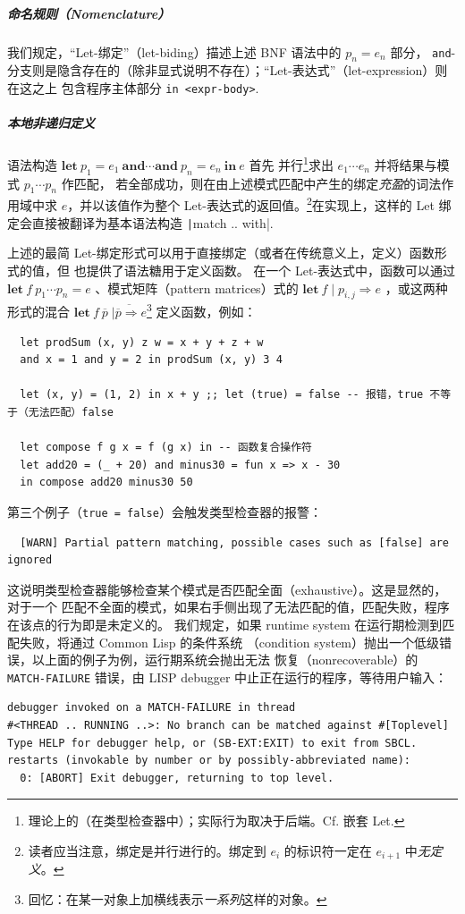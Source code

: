 \documentclass[a4paper, 11pt]{article}
\theoremstyle{remark}\newtheorem*{remark}{Remark}
\theoremstyle{definition}\newtheorem*{definition}{Definition}
\begin{document}
\subparagraph*{命名规则（Nomenclature）} 我们规定，“Let-绑定”（let-biding）描述上述 BNF 语法中的 $p_n = e_n$ 部分，
\texttt{and}-分支则是隐含存在的（除非显式说明不存在）；“Let-表达式”（let-expression）则在这之上
包含程序主体部分 \texttt{in <expr-body>}.
\subparagraph*{本地非递归定义} 语法构造 $\mathbf{let}\ p_1 = e_1\ \mathbf{and}\cdots\mathbf{and}\ p_n = e_n\ \mathbf{in}\ e$ 首先
并行\footnote{理论上的（在类型检查器中）；实际行为取决于后端。Cf. 嵌套 Let.}求出 \(e_1\cdots e_n\) 并将结果与模式 \(p_1\cdots p_n\) 作匹配，
若全部成功，则在由上述模式匹配中产生的绑定\emph{充盈}的词法作用域中求 $e$，并以该值作为整个 Let-表达式的返回值。\footnote{
  读者应当注意，绑定是并行进行的。绑定到 \(e_{i}\) 的标识符一定在 \(e_{i+1}\) 中\emph{无定义}。
}在实现上，这样的 Let 绑定会直接被翻译为基本语法构造 \texttt|match .. with|.

上述的最简 Let-绑定形式可以用于直接绑定（或者在传统意义上，定义）函数形式的值，但 \Tigris 也提供了语法糖用于定义函数。
在一个 Let-表达式中，函数可以通过 \(\mathbf{let}\ f\ p_1\cdots p_n = e\) 、模式矩阵（pattern matrices）式的 \(\mathbf{let}\ f\mid p_{i,j}\Rightarrow e\) ，或这两种
形式的混合 \(\mathbf{let}\ f\ \overline{p}\;\overline{\mid \overline{p}\Rightarrow e}\)\footnote{
  回忆：在某一对象上加横线表示\emph{一系列}这样的对象。
}
定义函数，例如：
\begin{verbatim}
  let prodSum (x, y) z w = x + y + z + w
  and x = 1 and y = 2 in prodSum (x, y) 3 4

  let (x, y) = (1, 2) in x + y ;; let (true) = false -- 报错，true 不等于（无法匹配）false

  let compose f g x = f (g x) in -- 函数复合操作符
  let add20 = (_ + 20) and minus30 = fun x => x - 30
  in compose add20 minus30 50
\end{verbatim}
第三个例子（\texttt{true = false}）会触发类型检查器的报警：
\begin{Verbatim}
  [WARN] Partial pattern matching, possible cases such as [false] are ignored
\end{Verbatim}
这说明类型检查器能够检查某个模式是否匹配全面（exhaustive）。这是显然的，对于一个
匹配不全面的模式，如果右手侧出现了无法匹配的值，匹配失败，程序在该点的行为即是未定义的。
我们规定，如果 runtime system 在运行期检测到匹配失败，将通过 Common Lisp 的条件系统
（condition system）抛出一个低级错误，以上面的例子为例，运行期系统会抛出无法
恢复（nonrecoverable）的 \texttt{MATCH-FAILURE}
错误，由 LISP debugger 中止正在运行的程序，等待用户输入：
\begin{Verbatim}
debugger invoked on a MATCH-FAILURE in thread
#<THREAD .. RUNNING ..>: No branch can be matched against #[Toplevel]
Type HELP for debugger help, or (SB-EXT:EXIT) to exit from SBCL.
restarts (invokable by number or by possibly-abbreviated name):
  0: [ABORT] Exit debugger, returning to top level.
\end{Verbatim}
\end{document}
